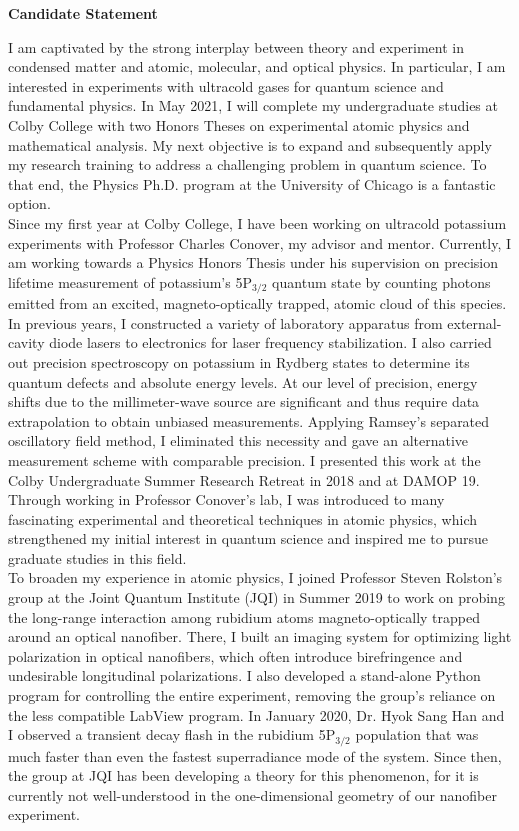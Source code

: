 \documentclass[12pt]{article}
\begin{document}
\begin{center}
	\textbf{Candidate Statement}
\end{center}
I am captivated by the strong interplay between theory and experiment in condensed matter and atomic, molecular, and optical physics. In particular, I am interested in experiments with ultracold gases for quantum science and fundamental physics. In May 2021, I will complete my undergraduate studies at Colby College with two Honors Theses on experimental atomic physics and mathematical analysis. My next objective is to expand and subsequently apply my research training to address a challenging problem in quantum science. To that end, the Physics Ph.D. program at the University of Chicago is a fantastic option.  \\ 

Since my first year at Colby College, I have been working on ultracold potassium experiments with Professor Charles Conover, my advisor and mentor. Currently, I am working towards a Physics Honors Thesis under his supervision on precision lifetime measurement of potassium's 5P$_{\text{3/2}}$ quantum state by counting photons emitted from an excited, magneto-optically trapped, atomic cloud of this species. In previous years, I constructed a variety of laboratory apparatus from external-cavity diode lasers to electronics for laser frequency stabilization. I also carried out precision spectroscopy on potassium in Rydberg states to determine its quantum defects and absolute energy levels. At our level of precision, energy shifts due to the millimeter-wave source are significant and thus require data extrapolation to obtain unbiased measurements. Applying Ramsey's separated oscillatory field method, I eliminated this necessity and gave an alternative measurement scheme with comparable precision. I presented this work at the Colby Undergraduate Summer Research Retreat in 2018 and at DAMOP 19. Through working in Professor Conover's lab, I was introduced to many fascinating experimental and theoretical techniques in atomic physics, which strengthened my initial interest in quantum science and inspired me to pursue graduate studies in this field.  \\


To broaden my experience in atomic physics, I joined Professor Steven Rolston's group at the Joint Quantum Institute (JQI) in Summer 2019 to work on probing the long-range interaction among rubidium atoms magneto-optically trapped around an optical nanofiber. There, I built an imaging system for optimizing light polarization in optical nanofibers, which often introduce birefringence and undesirable longitudinal polarizations. I also developed a stand-alone Python program for controlling the entire experiment, removing the group's reliance on the less compatible LabView program. In January 2020, Dr. Hyok Sang Han and I observed a transient decay flash in the rubidium 5P$_{\text{3/2}}$ population that was much faster than even the fastest superradiance mode of the system.  Since then, the group at JQI has been developing a theory for this phenomenon, for it is currently not well-understood in the one-dimensional geometry of our nanofiber experiment. \\ 
\end{document}
